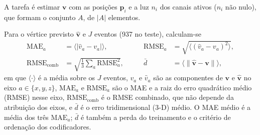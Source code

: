 A tarefa é estimar $\mathbf{v}$ com as posições $\mathbf{p}_i$ e a luz $n_i$ dos canais ativos ($n_i$ não nulo), que formam o conjunto $A$, de $|A|$ elementos.

Para o vértice previsto $\hat{\mathbf{v}}$ e $J$ eventos (\num{937} no teste), calculam-se
\begin{equation}
  \begin{aligned}
    \mathrm{MAE}_a &= \bigl\langle \lvert \hat{v}_a - v_a \rvert \bigr\rangle, &\qquad
    \mathrm{RMSE}_a &= \sqrt{\bigl\langle (\hat{v}_a - v_a)^2 \bigr\rangle}, \\
    \mathrm{RMSE}_{\mathrm{comb}} &= \sqrt{\tfrac{1}{3} \textstyle\sum_{a} \mathrm{RMSE}_a^2}, &\qquad
    \bar{d} &= \bigl\langle \lVert \hat{\mathbf{v}} - \mathbf{v} \rVert \bigr\rangle,
  \end{aligned}
  \label{eq:metricas}
\end{equation}
em que $\langle\cdot\rangle$ é a média sobre os $J$ eventos, $v_a$ e $\hat{v}_a$ são as componentes de $\mathbf{v}$ e $\hat{\mathbf{v}}$ no eixo $a \in \{x, y, z\}$, $\mathrm{MAE}_a$ e $\mathrm{RMSE}_a$ são o MAE e a raiz do erro quadrático médio (RMSE) nesse eixo, $\mathrm{RMSE}_{\mathrm{comb}}$ é o RMSE combinado, que não depende da atribuição dos eixos, e $\bar{d}$ é o erro tridimensional (3-D) médio. O MAE médio é a média dos três $\mathrm{MAE}_a$; $\bar{d}$ é também a perda do treinamento e o critério de ordenação dos codificadores.
